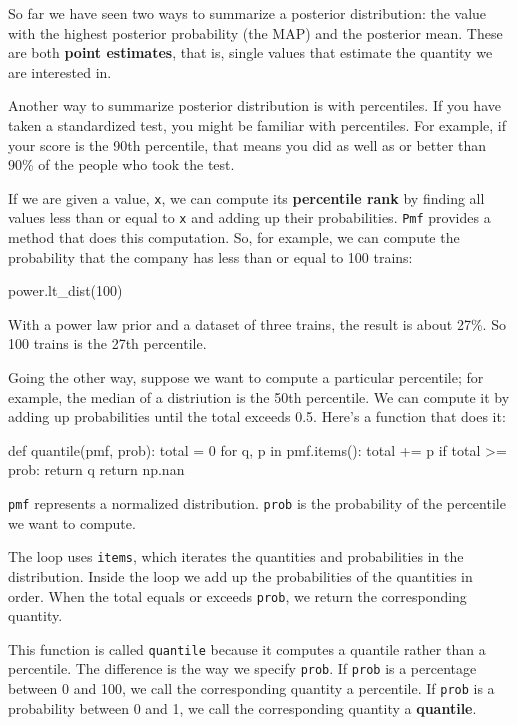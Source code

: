 \documentclass[12pt]{book}
\theoremstyle{exercise}
\newcommand{\py}[1]{{\tt #1}}%
\begin{document}
So far we have seen two ways to summarize a posterior distribution: the value with the highest posterior probability (the MAP) and the posterior mean.
These are both {\bf point estimates}, that is, single values that estimate the quantity we are interested in.

Another way to summarize posterior distribution is with percentiles.
If you have taken a standardized test, you might be familiar with percentiles.
For example, if your score is the 90th percentile, that means you did as well as or better than 90\% of the people who took the test.

If we are given a value, \py{x}, we can compute its {\bf percentile rank} by finding all values less than or equal to \py{x} and adding up their probabilities.
\py{Pmf} provides a method that does this computation.
So, for example, we can compute the probability that the company has less than or equal to 100 trains:

\begin{code}
power.lt_dist(100)
\end{code}

With a power law prior and a dataset of three trains, the result is about 27\%.
So 100 trains is the 27th percentile.

Going the other way, suppose we want to compute a particular percentile; for example, the median of a distriution is the 50th percentile.
We can compute it by adding up probabilities until the total exceeds 0.5.
Here's a function that does it:

\begin{code}
def quantile(pmf, prob):
    total = 0
    for q, p in pmf.items():
        total += p
        if total >= prob:
            return q
    return np.nan
\end{code}

\py{pmf} represents a normalized distribution.
\py{prob} is the probability of the percentile we want to compute.

The loop uses \py{items}, which iterates the quantities and probabilities in the distribution.
Inside the loop we add up the probabilities of the quantities in order.
When the total equals or exceeds \py{prob}, we return the corresponding quantity.

This function is called \py{quantile} because it computes a quantile rather than a percentile.
The difference is the way we specify \py{prob}.
If \py{prob} is a percentage between 0 and 100, we call the corresponding quantity a percentile.
If \py{prob} is a probability between 0 and 1, we call the corresponding quantity a {\bf quantile}.
\end{document}
